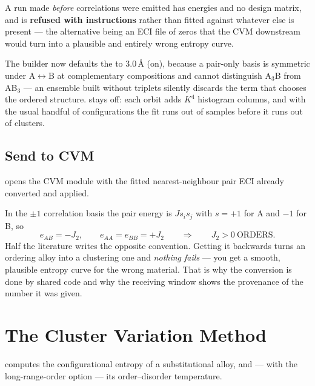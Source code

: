 A run made \emph{before} correlations were emitted has energies and no design
matrix, and is \textbf{refused with instructions} rather than fitted against
whatever else is present --- the alternative being an ECI file of zeros that the
CVM downstream would turn into a plausible and entirely wrong entropy curve.

The builder now defaults the  to 3.0\,\AA{} (on), because a
pair-only basis is symmetric under A$\leftrightarrow$B at complementary
compositions and cannot distinguish A$_3$B from AB$_3$ --- an ensemble built
without triplets silently discards the term that chooses the ordered structure.
 stays off: each orbit adds $K^4$ histogram columns, and
with the usual handful of configurations the fit runs out of samples before it
runs out of clusters.

\subsection{Send to CVM}

 opens the CVM module with the fitted nearest-neighbour
pair ECI already converted and applied.

\begin{calwarn}
In the $\pm 1$ correlation basis the pair energy is $J s_i s_j$ with $s = +1$
for A and $-1$ for B, so
\begin{equation}
  e_{AB} = -J_2 , \qquad e_{AA} = e_{BB} = +J_2
  \qquad\Longrightarrow\qquad J_2 > 0 \ \text{ORDERS} .
  \label{eq:eci-sign}
\end{equation}
Half the literature writes the opposite convention. Getting it backwards turns
an ordering alloy into a clustering one and \emph{nothing fails} --- you get a
smooth, plausible entropy curve for the wrong material. That is why the
conversion is done by shared code and why the receiving window shows the
provenance of the number it was given.
\end{calwarn}

\section{The Cluster Variation Method}
\label{sec:cvm}

\menusep{}\menusep{} computes the configurational entropy of a substitutional
alloy, and --- with the long-range-order option --- its order--disorder
temperature.

